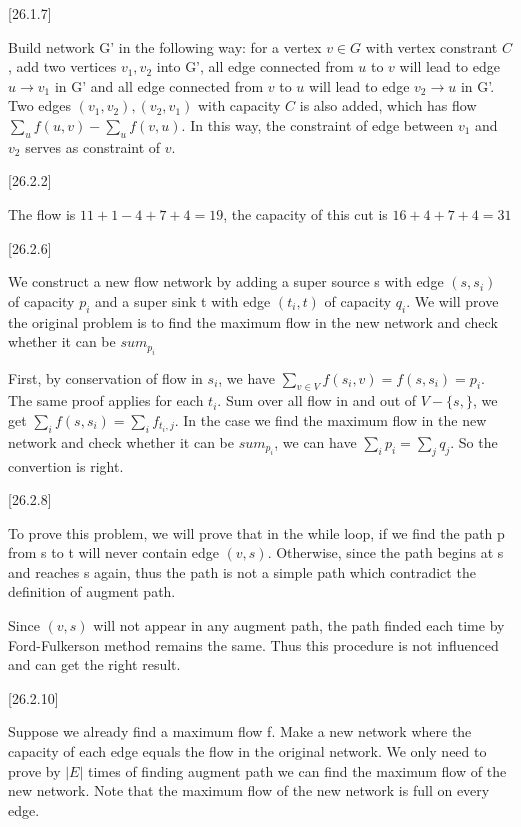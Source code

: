 \documentclass[language=english]{njurepo}
\begin{document}
 [26.1.7]
 
  
    Build network G' in the following way: for a vertex $v\in G$ with vertex constrant $C$, add two vertices $v_1,v_2$ into G', all edge connected from $u$ to $v$ will lead to edge $u\rightarrow v_1$ in G' and all edge connected from $v$ to $u$ will lead to edge $v_2\rightarrow u$ in G'. Two edges $(v_1,v_2),(v_2,v_1)$ with capacity $C$ is also added, which has flow $\sum_{u}f(u,v)-\sum_{u}f(v,u)$. In this way, the constraint of edge between $v_1$ and $v_2$ serves as constraint of $v$.

  

 [26.2.2]
 
  
    The flow is $11+1-4+7+4=19$, the capacity of this cut is $16+4+7+4=31$
  

 [26.2.6]
 
  
    We construct a new flow network by adding a super source s with edge $(s,s_i)$ of capacity $p_i$ and a super sink t with edge $(t_i,t)$ of capacity $q_i$. We will prove the original problem is to find the maximum flow in the new network and check whether it can be $sum_{p_i}$

    First, by conservation of flow in $s_i$, we have $\sum_{v\in V}f(s_i,v)=f(s,s_i)=p_i$. The same proof applies for each $t_i$. Sum over all flow in and out of $V-\{s,\}$, we get $\sum_{i}f(s,s_i)=\sum_{i}f_{t_i,j}$. In the case we find the maximum flow in the new network and check whether it can be $sum_{p_i}$, we can have $\sum_ip_i=\sum_jq_j$. So the convertion is right.
  

 [26.2.8]
 
  
    To prove this problem, we will prove that in the while loop, if we find the path p from s to t will never contain edge $(v,s)$. Otherwise, since the path begins at s and reaches s again, thus the path is not a simple path which contradict the definition of augment path.

    Since $(v,s)$ will not appear in any augment path, the path finded each time by Ford-Fulkerson method remains the same. Thus this procedure is not influenced and can get the right result.

  

 [26.2.10]
 
  
    Suppose we already find a maximum flow f. Make a new network where the capacity of each edge equals the flow in the original network. We only need to prove by $|E|$ times of finding augment path we can find the maximum flow of the new network. Note that the maximum flow of the new network is full on every edge.
\end{document}
